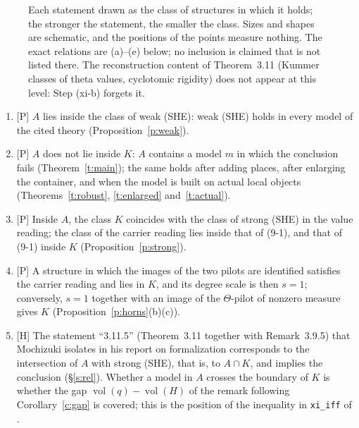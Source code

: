\documentclass[11pt]{article}
\theoremstyle{plain}
\theoremstyle{definition}
\theoremstyle{remark}
\newcommand{\Pmark}{\textup{[P]}}
\newcommand{\Hmark}{\textup{[H]}}
\newcommand{\vol}{\operatorname{vol}}
\begin{document}
\begin{figure}[ht]
\caption{Each statement drawn as the class of structures in which it holds; the stronger
the statement, the smaller the class. Sizes and shapes are schematic, and the positions of
the points measure nothing. The exact relations are (a)--(e) below; no inclusion is claimed
that is not listed there. The reconstruction content of Theorem~3.11 (Kummer classes of
theta values, cyclotomic rigidity) does not appear at this level: Step (xi-b) forgets it.}\label{fig:venn}
\end{figure}

\begin{enumerate}[label=(\alph*),leftmargin=2.2em]
\item \Pmark{} $A$ lies inside the class of weak (SHE): weak (SHE) holds in every model of
  the cited theory (Proposition~\ref{p:weak}).
\item \Pmark{} $A$ does not lie inside $K$: $A$ contains a model $m$ in which the
  conclusion fails (Theorem~\ref{t:main}); the same holds after adding places, after
  enlarging the container, and when the model is built on actual local objects
  (Theorems~\ref{t:robust}, \ref{t:enlarged} and~\ref{t:actual}).
\item \Pmark{} Inside $A$, the class $K$ coincides with the class of strong (SHE) in the
  value reading; the class of the carrier reading lies inside that of (9-1), and that of
  (9-1) inside $K$ (Proposition~\ref{p:strong}).
\item \Pmark{} A structure in which the images of the two pilots are identified satisfies
  the carrier reading and lies in $K$, and its degree scale is then $s=1$; conversely, $s=1$
  together with an image of the $\Theta$-pilot of nonzero measure gives $K$
  (Proposition~\ref{p:horns}(b)(c)).
\item \Hmark{} The statement ``3.11.5'' (Theorem~3.11 together with Remark~3.9.5) that
  Mochizuki isolates in his report on formalization \cite[\S4]{Form} corresponds to the
  intersection of $A$ with strong (SHE), that is, to $A\cap K$, and implies the conclusion
  (\S\ref{s:rel}). Whether a model in $A$ crosses the boundary of $K$ is whether the gap
  $\vol(q)-\vol(H)$ of the remark following Corollary~\ref{c:gap} is covered; this is the
  position of the inequality in \texttt{xi\_iff} of \cite{lana}.
\end{enumerate}
\end{document}
